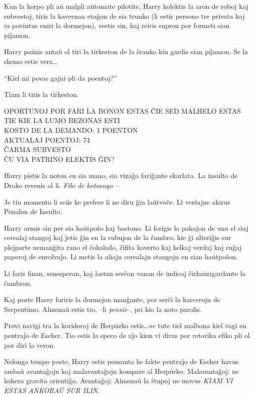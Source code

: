 Kun la korpo pli aŭ malpli aŭtomate pilotite, Harry kolektis la aron
de roboj kaj subvestoj, tiris la kavernan etaĝon de sia trunko (li estis
persono tre privata kaj iu povintus eniri la dormejon), vestis
sin, kaj reiris supren por formeti sian piĵamon.

Harry paŭzis antaŭ ol tiri la tirkeston de la ŝranko kiu gardis sian piĵamon. Se
la skemo estis vera\ldots

``Kiel mi povas gajni pli da poentoj?''

Tiam li tiris la tirkeston.

\begin{center}
OPORTUNOJ POR FARI LA BONON ESTAS ĈIE SED MALHELO ESTAS TIE KIE LA
LUMO BEZONAS ESTI \\
KOSTO DE LA DEMANDO: 1 POENTON\\
AKTUALAJ POENTOJ: 74\\
ĈARMA SUBVESTO \\
ĈU VIA PATRINO ELEKTIS ĜIN? \\
\end{center}

Harry pistis la noton en sia mano, sia vizaĝo fariĝante skarlata. La
insulto de Drako revenis al li. \emph{Filo de kotsango—}

Je tiu momento li sciis ke prefere li ne diru ĝin laŭtvoĉe. Li
verŝajne akirus Penalon de Insulto.

Harry armis sin per sia haŭtpoŝo kaj bastono. Li forigis la pakaĵon de unu el
siaj cerealaj stangoj kaj ĵetis ĝin en la rubujon de la ĉambro, kie ĝi alteriĝis
sur plejparte nemanĝita rano el ĉokolado, ĉifita koverto kaj kelkaj verdaj kaj
ruĝaj paperoj de envolvaĵo. Li metis la aliajn cerealajn stangojn en sian
haŭtpoŝon.

Li faris finan, senesperan, kaj lastan serĉon vanan de indicoj
ĉirkaŭrigardante la ĉambron.

Kaj poste Harry foriris la dormejon manĝante, por serĉi la karcerojn de
Serpentimo. Almenaŭ estis tio, --li \emph{pensis}--, pri kio la noto parolis.

Provi navigi tra la koridoroj de Herpŭrko estis\ldots \emph{ne} tute tiel malbona
kiel vagi en pentraĵo de Escher. Tio estis la speco de aĵo kion vi dirus por
retorika efiko pli ol por diri la veron.

Nelonga tempo poste, Harry estis pensanta ke fakte pentraĵo de Escher
havus ambaŭ avantaĝojn kaj malavantaĝojn kompare al
Herpŭrko. Malavantaĝoj: ne kohera gravita orientiĝo. Avantaĝoj:
Almenaŭ la ŝtupoj ne movus \emph{KIAM VI ESTAS ANKORAŬ SUR ILIN.}

